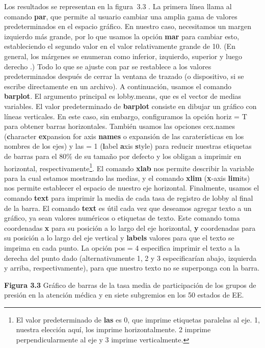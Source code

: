 \documentclass[
]{book}
\begin{document}
Los resultados se representan en la figura  3.3 . La primera línea llama al comando \textbf{par}, que permite al usuario cambiar una amplia gama de valores predeterminados en el espacio gráfico. En nuestro caso, necesitamos un margen izquierdo más grande, por lo que usamos la opción \textbf{mar} para cambiar esto, estableciendo el segundo valor en el valor relativamente grande de 10. (En general, los márgenes se enumeran como inferior, izquierdo, superior y luego derecho .) Todo lo que se ajuste con par se restablece a los valores predeterminados después de cerrar la ventana de trazado (o dispositivo, si se escribe directamente en un archivo). A continuación, usamos el comando \textbf{barplot}. El argumento principal es lobby.means, que es el vector de medias variables. El valor predeterminado de \textbf{barplot} consiste en dibujar un gráfico con líneas verticales. En este caso, sin embargo, configuramos la opción horiz = T para obtener barras horizontales. También usamos las opciones cex.names (\textbf{c}haracter \textbf{ex}pansion for axis \textbf{names} o expansión de las caraterísticas en los nombres de los ejes) y las = 1 (\textbf{l}abel \textbf{a}xis \textbf{s}tyle) para reducir nuestras etiquetas de barras para el 80\% de su tamaño por defecto y los obligan a imprimir en horizontal, respectivamente\footnote{El valor predeterminado de \textbf{las} es 0, que imprime etiquetas paralelas al eje. 1, nuestra elección aquí, los imprime horizontalmente. 2 imprime perpendicularmente al eje y 3 imprime verticalmente.}. El comando \textbf{xlab} nos permite describir la variable para la cual estamos mostrando las medias, y el comando \textbf{xlim} (\textbf{x}-axis \textbf{lim}its) nos permite establecer el espacio de nuestro eje horizontal. Finalmente, usamos el comando \textbf{text} para imprimir la media de cada tasa de registro de lobby al final de la barra. El comando \textbf{text} es útil cada vez que deseamos agregar texto a un gráfico, ya sean valores numéricos o etiquetas de texto. Este comando toma coordenadas \textbf{x} para su posición a lo largo del eje horizontal, \textbf{y} coordenadas para su posición a lo largo del eje vertical y \textbf{labels} valores para que el texto se imprima en cada punto. La opción pos = 4 especifica imprimir el texto a la derecha del punto dado (alternativamente 1, 2 y 3 especificarían abajo, izquierda y arriba, respectivamente), para que nuestro texto no se superponga con la barra.

\textbf{Figura 3.3} Gráfico de barras de la tasa media de participación de los grupos de presión en la atención médica y en siete subgremios en los 50 estados de EE.
\end{document}
